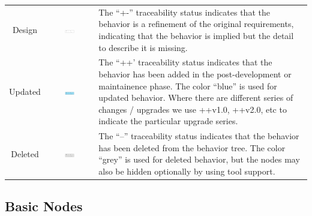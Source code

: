 \documentclass[]{article}
\begin{document}
\begin{landscape}
\begin{center}
\begin{longtable}[c]{|c|c|p{12cm}|}
 &&\\
 \hline
 \multirow{3}{*}{Design} & \multirow{3}{*}{\includegraphics[width=0.23\textwidth]{figs/AppendixB/Tags/Updated.pdf}} & \multirow{3}{12cm}{The ``+-'' traceability status indicates that the behavior is a refinement of the original requirements, indicating that the behavior is implied but the detail to describe it is missing.} \\*
 &&\\
 &&\\
 \hline
 \multirow{6}{*}{Updated} & \multirow{6}{*}{\includegraphics[width=0.23\textwidth]{figs/AppendixB/Tags/Refinement.pdf}}  & \multirow{6}{12cm}{The ``++' traceability status indicates that the behavior has been added in the post-development or maintainence phase. The color ``blue'' is used for updated behavior. Where there are different series of changes / upgrades we use ++v1.0, ++v2.0, etc to indicate the particular upgrade series.}\\*
 &&\\
 &&\\
 &&\\
 &&\\
 &&\\
 \hline
 \multirow{5}{*}{Deleted} &  \multirow{5}{*}{\includegraphics[width=0.23\textwidth]{figs/AppendixB/Tags/Deleted.pdf}} & \multirow{5}{12cm}{The ``--'' traceability status indicates that the behavior has been deleted from the behavior tree. The color ``grey'' is used for deleted behavior, but the nodes may also be hidden optionally by using tool support.} \\*
 &&\\
 &&\\
 &&\\
 &&\\
 \hline
\end{longtable}
\end{center}

\onehalfspacing

\subsection{Basic Nodes}


\end{landscape}
\end{document}
